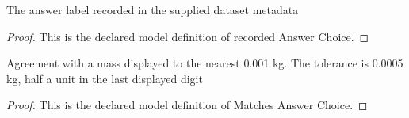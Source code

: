 \begin{definition}
  \label{def:physics:phyx-mini-0298:phyxminiproblems-problemphyxmini0298-recordedanswerchoice}
  The answer label recorded in the supplied dataset metadata
\end{definition}
\begin{proof}
  This is the declared model definition of recorded Answer Choice.
\end{proof}
\begin{definition}
  \label{def:physics:phyx-mini-0298:phyxminiproblems-problemphyxmini0298-matchesanswerchoice}
  Agreement with a mass displayed to the nearest 0.001 kg. The tolerance is 0.0005 kg, half a unit in the last displayed digit
\end{definition}
\begin{proof}
  This is the declared model definition of Matches Answer Choice.
\end{proof}
